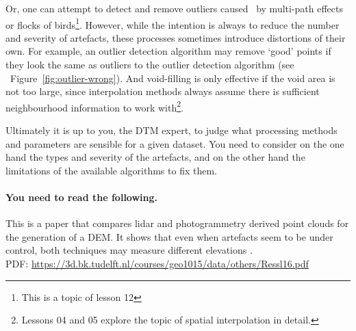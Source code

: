 Or, one can attempt to detect and remove outliers caused \eg\  by multi-path effects or flocks of birds\footnote{This is a topic of lesson 12}. 
However, while the intention is always to reduce the number and severity of artefacts, these processes sometimes introduce distortions of their own.
For example, an outlier detection algorithm may remove `good' points if they look the same as outliers to the outlier detection algorithm (see \eg\ Figure~\ref{fig:outlier-wrong}).
And void-filling is only effective if the void area is not too large, since interpolation methods always assume there is sufficient neighbourhood information to work with\footnote{Lessons 04 and 05 explore the topic of spatial interpolation in detail.}.

Ultimately it is up to you, the DTM expert, to judge what processing methods and parameters are sensible for a given dataset.
You need to consider on the one hand the types and severity of the artefacts, and on the other hand the limitations of the available algorithms to fix them. 

\begin{practical-stuff}
	\paragraph{You need to read the following.}
	This is a paper that compares lidar and photogrammetry derived point clouds for the generation of a DEM\@. It shows that even when artefacts seem to be under control, both techniques may measure different elevations \citep{Ressl16}. 
	\\
	PDF: \url{https://3d.bk.tudelft.nl/courses/geo1015/data/others/Ressl16.pdf}
\end{practical-stuff}





